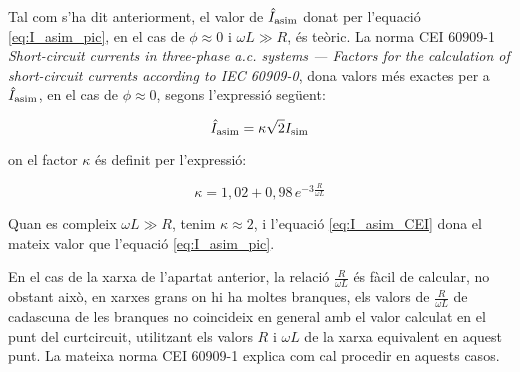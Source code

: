 Tal com s'ha dit anteriorment, el valor de $\hat{I}_\mathrm{asim}$ donat per l'equació \eqref{eq:I_asim_pic}, en el cas de $\phi \approx 0$ i $\omega L\gg R$, és teòric. La norma CEI 60909-1 \textit{Short-circuit currents in three-phase a.c. systems ---  Factors for the calculation of short-circuit currents according to IEC 60909-0}, dona valors més exactes per a $\hat{I}_\mathrm{asim}$, en el cas de $\phi \approx 0$, segons l'expressió següent:

\begin{equation}
    \hat{I}_\mathrm{asim} = \kappa \sqrt{2} I_\mathrm{sim} \label{eq:I_asim_CEI}
\end{equation}

on el factor $\kappa$ és definit per l'expressió:

\begin{equation}
    \kappa = 1{,}02 + 0{,}98 \,e^{-3\frac{R}{\omega L}}\label{eq:kappa_CEI}
\end{equation}

Quan es compleix $\omega L\gg R$, tenim $\kappa \approx 2$, i l'equació \eqref{eq:I_asim_CEI} dona el mateix valor que l'equació \eqref{eq:I_asim_pic}.

En el cas de la xarxa de l'apartat anterior, la relació $\frac{R}{\omega L}$ és fàcil de  calcular, no obstant això, en xarxes grans on hi ha moltes branques, els valors de $\frac{R}{\omega L}$ de cadascuna de les branques no coincideix en general amb el valor calculat en el punt del curtcircuit, utilitzant els valors $R$ i $\omega L$ de la xarxa equivalent en aquest punt. La mateixa norma CEI 60909-1 explica com cal procedir en aquests casos.


